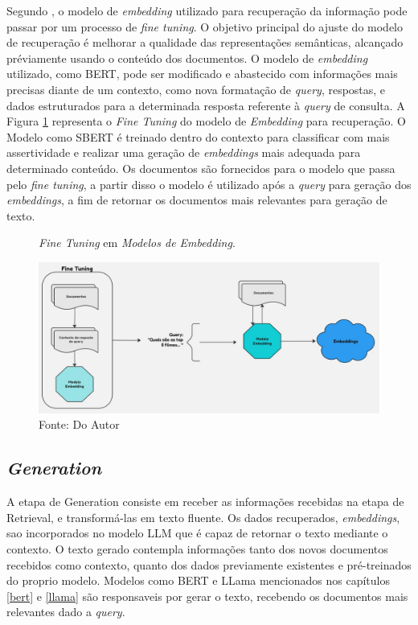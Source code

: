 Segundo \cite{liu2023building}, o modelo de \textit{embedding} utilizado para recuperação da informação pode passar por um processo de \textit{fine tuning}. O objetivo principal do ajuste do modelo de recuperação é melhorar a qualidade das representações semânticas, alcançado préviamente usando o conteúdo dos documentos. O modelo de \textit{embedding} utilizado, como BERT, pode ser modificado e abastecido com informações mais precisas diante de um contexto, como nova formatação de \textit{query}, respostas, e dados estruturados para a determinada resposta referente à \textit{query} de consulta.
A Figura  \ref{fig:retrieval2} representa o \textit{Fine Tuning} do modelo de \textit{Embedding} para recuperação. O Modelo como SBERT é treinado dentro do contexto para classificar com mais assertividade e realizar uma geração de \textit{embeddings} mais adequada para determinado conteúdo. Os documentos são fornecidos para o modelo que passa pelo \textit{fine tuning}, a partir disso o modelo é utilizado após a \textit{query} para geração dos \textit{embeddings}, a fim de retornar os documentos mais relevantes para geração de texto.

\begin{figure}[!htb]
    \centering
    \caption{\textit{Fine Tuning} em \textit{Modelos de Embedding}.}
    \includegraphics[width=\linewidth]{img/retrieval2.jpg}
    \caption*{Fonte: Do Autor}
    \label{fig:retrieval2}
\end{figure}

\subsection{\textit{Generation}}

A etapa de Generation consiste em receber as informações recebidas na etapa de Retrieval, e transformá-las em texto fluente. Os dados recuperados, \textit{embeddings}, sao incorporados no modelo LLM que é capaz de retornar o texto mediante o contexto. O texto gerado contempla informações tanto dos novos documentos recebidos como contexto, quanto dos dados previamente existentes e pré-treinados do proprio modelo. Modelos como BERT \cite{alaparthi2020bidirectionalencoderrepresentationstransformers} e LLama \cite{llama3modelcard} mencionados nos capítulos \ref{bert} e \ref{llama} são responsaveis por gerar o texto, recebendo os documentos mais relevantes dado a \textit{query}.


